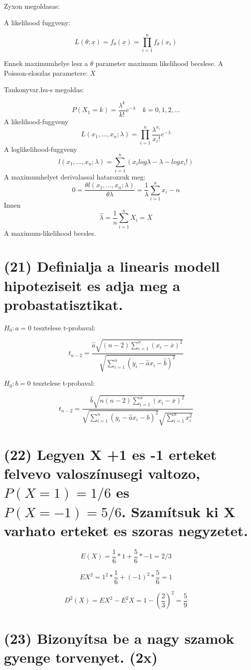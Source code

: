 \documentclass[12p]{article}
\begin{document}
Zyxon megoldasas:

A likelihood fuggveny:

$$L(\theta;\underline{x}) = f_{\theta}(\underline{x}) = \prod^n_{i=1} f_{\theta}(x_i)$$

Ennek maximumhelye lesz a $\theta$ parameter maximum likelihood becslese. A Poisson-eloszlas parametere: $\overline{X}$

Tankonyvar.hu-s megoldas:

$$P(X_1 = k) = \frac{\lambda^k}{k!}e^{-\lambda}\quad k=0, 1, 2, ...$$
A likelihood-fuggveny
$$L(x_1, ..., x_n;\lambda)=\prod^n_{i=1}\frac{\lambda^{x_i}}{x_i!}e^{-\lambda}$$
A loglikelihood-fuggveny
$$l(x_1, ..., x_n;\lambda) = \sum^n_{i=1}(x_i log \lambda - \lambda - log x_i!)$$
A maximumhelyet derivalassal hatarozzuk meg:
$$0 = \frac{\theta l(x_1, ..., x_n;\lambda)}{\theta \lambda} = \frac{1}{\lambda} \sum^n_{i=1} x_i - n$$
Innen
$$\hat{\lambda} = \frac{1}{n} \sum^n_{i=1} X_i = \overline{X}$$
A maximum-likelihood becsles.

\section{(21) Definialja a linearis modell hipoteziseit es adja meg a probastatisztikat.}

$H_0: a = 0$ tesztelese t-probaval:

$$t_{n-2} = \frac{\hat{a} \sqrt{(n-2) \sum_{i=1}^n(x_i - \overline{x})^2}}{\sqrt{\sum_{i=1}^n (y_i - \hat{a}x_i- \hat{b})^2}}$$

$H_0:b=0$ tesztelese t-probaval:

$$t_{n-2} = \frac{\hat{b} \sqrt{n(n-2)\sum_{i=1}^n (x_i - \overline{x})^2}}{\sqrt{\sum_{i=1}^n (y_i - \hat{a}x_i - b)^2}\sqrt{\sum_{i=1}^n x_i^2}}$$

\section{(22) Legyen X +1 es -1 erteket felvevo valoszínusegi valtozo, $P(X = 1) = 1/6$ es $P(X = -1) = 5/6$. Szamítsuk ki X varhato erteket es szoras negyzetet.}

$$ E(X) = \frac{1}{6} * 1 + \frac{5}{6} * -1 = 2/3$$

$$ EX^2 = 1^2 * \frac{1}{6} + (-1)^2 * \frac{5}{6} = 1$$

$$ D^2(X) = EX^2 - E^2X = 1 - \left(\frac{2}{3}\right)^2 = \frac{5}{9}$$

\section{(23) Bizonyítsa be a nagy szamok gyenge torvenyet. (2x)}
\end{document}
